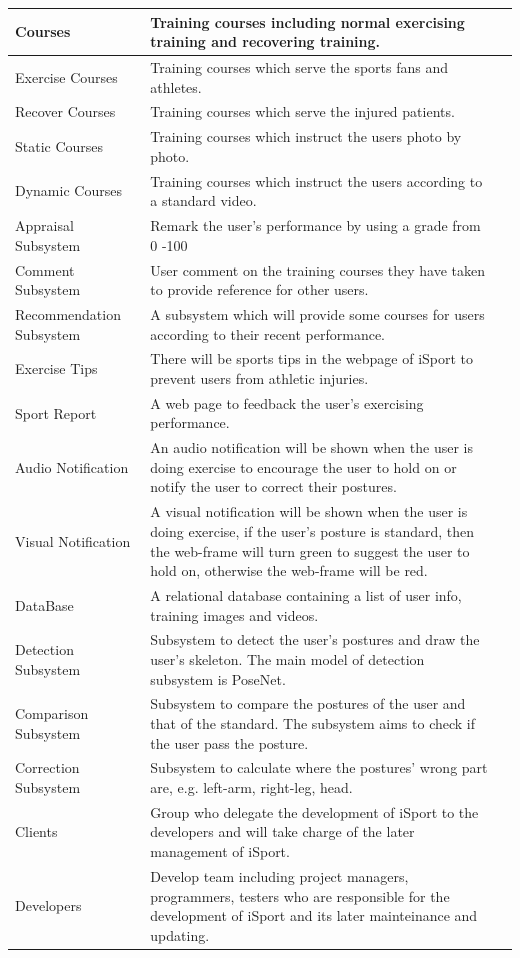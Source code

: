 \documentclass[16pt]{scrreprt}
\begin{document}
\begin{longtable}{|p{1.9in}|p{4in}|c|}
Courses & Training courses including normal exercising training and recovering training.\\ \hline
Exercise Courses & Training courses which serve the sports fans and athletes.\\ \hline
Recover Courses & Training courses which serve the injured patients.\\ \hline
Static Courses & Training courses which instruct the users photo by photo.\\ \hline
Dynamic Courses & Training courses which instruct the users according to a standard video.\\ \hline
Appraisal Subsystem & Remark the user's performance by using a grade from 0 -100\\ \hline
Comment Subsystem & User comment on the training courses they have taken to provide reference for other users.\\ 
\hline 
Recommendation Subsystem & A subsystem which will provide some courses for users according to their recent performance.\\ 
\hline
Exercise Tips & There will be sports tips in the webpage of iSport to prevent users from athletic injuries.\\ 
\hline 
Sport Report & A web page to feedback the user's exercising performance.\\ 
\hline 
Audio Notification & An audio notification will be shown when the user is doing exercise to encourage the user to hold on or notify the user to correct their postures.\\ 
\hline 
Visual Notification & A visual notification will be shown when the user is doing exercise, if the user's posture is standard, then the web-frame will turn green to suggest the user to hold on, otherwise the web-frame will be red.\\ 
\hline 
DataBase & A relational database containing a list of user info, training images and videos.\\ 
\hline 
Detection Subsystem & Subsystem to detect the user's postures and draw the user's skeleton. The main model of detection subsystem is PoseNet.\\ 
\hline 
Comparison Subsystem & Subsystem to compare the postures of the user and that of the standard. The subsystem aims to check if the user pass the posture.\\ 
\hline 
Correction Subsystem & Subsystem to calculate where the postures' wrong part are, e.g. left-arm, right-leg, head.\\ 
\hline 
Clients & Group who delegate the development of iSport to the developers and will take charge of the later management of iSport.\\ \hline
Developers & Develop team including project managers, programmers, testers who are responsible for the development of iSport and its later mainteinance and updating.\\ 
\hline 
\end{longtable}
\end{document}
